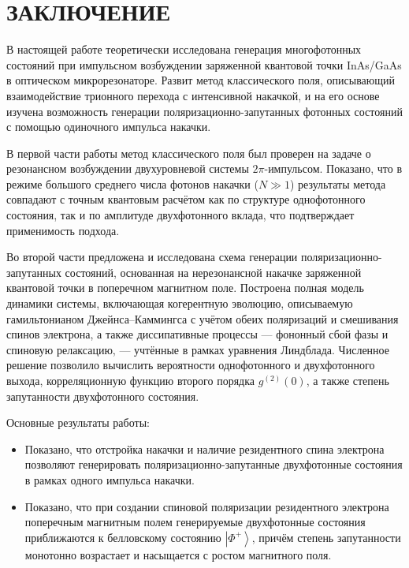 \documentclass[11pt]{article}    %
\numberwithin{equation}{section}
\begin{document}
\newpage

\section*{ЗАКЛЮЧЕНИЕ}
\par

В настоящей работе теоретически исследована генерация многофотонных
состояний при импульсном возбуждении заряженной квантовой точки
InAs/GaAs в оптическом микрорезонаторе. Развит метод классического поля,
описывающий взаимодействие трионного перехода с интенсивной
накачкой, и на его основе изучена возможность
генерации поляризационно-запутанных фотонных состояний с помощью
одиночного импульса накачки.

В первой части работы метод классического поля был проверен на
задаче о резонансном возбуждении двухуровневой системы $2\pi$-импульсом.
Показано, что в режиме большого среднего числа фотонов накачки
($N \gg 1$) результаты метода совпадают с точным квантовым расчётом
\cite{krainov2025} как по структуре однофотонного состояния, так и по
амплитуде двухфотонного вклада, что подтверждает применимость подхода.

Во второй части предложена и исследована схема генерации
поляризационно-запутанных состояний, основанная на нерезонансной
накачке заряженной квантовой точки в поперечном магнитном поле.
Построена полная модель динамики системы, включающая
когерентную эволюцию, описываемую гамильтонианом Джейнса--Каммингса с
учётом обеих поляризаций и смешивания спинов электрона, а
также диссипативные процессы --- фононный сбой фазы и спиновую
релаксацию, --- учтённые в рамках уравнения Линдблада. Численное решение
позволило вычислить вероятности однофотонного и двухфотонного выхода,
корреляционную функцию второго порядка $g^{(2)}(0)$, а также степень
запутанности двухфотонного состояния.

Основные результаты работы:

\begin{itemize}
    \item Показано, что отстройка накачки и наличие резидентного спина
    электрона позволяют генерировать поляризационно-запутанные
    двухфотонные состояния в рамках одного импульса накачки.

    \item Показано, что при создании спиновой поляризации резидентного
    электрона поперечным магнитным полем генерируемые двухфотонные
    состояния приближаются к белловскому состоянию
    $\left| \Phi^+ \right\rangle$, причём степень запутанности монотонно
    возрастает и насыщается с ростом магнитного поля.
\end{itemize}
\end{document}
